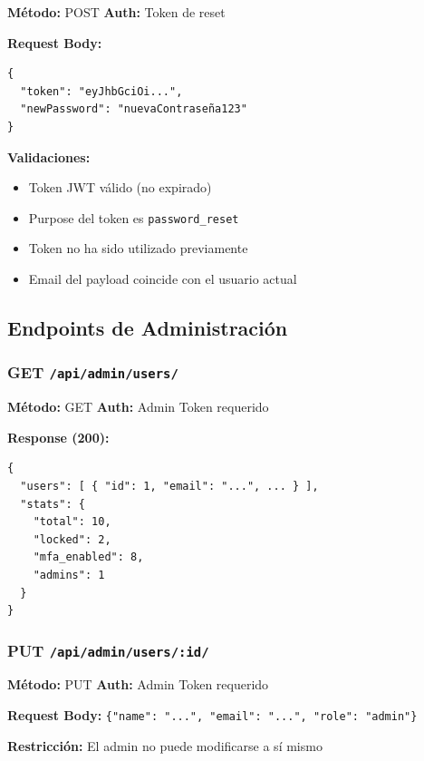 \documentclass[12pt,a4paper,openany]{article}
\begin{document}
\begin{infobox}
\textbf{Método:} POST \quad \textbf{Auth:} Token de reset

\textbf{Request Body:}
\begin{lstlisting}[style=jsstyle]
{
  "token": "eyJhbGciOi...",
  "newPassword": "nuevaContraseña123"
}
\end{lstlisting}

\textbf{Validaciones:}
\begin{itemize}
    \item Token JWT válido (no expirado)
    \item Purpose del token es \texttt{password\_reset}
    \item Token no ha sido utilizado previamente
    \item Email del payload coincide con el usuario actual
\end{itemize}
\end{infobox}

\subsection{Endpoints de Administración}

\subsubsection{GET \texttt{/api/admin/users/}}

\begin{infobox}
\textbf{Método:} GET \quad \textbf{Auth:} Admin Token requerido

\textbf{Response (200):}
\begin{lstlisting}[style=jsstyle]
{
  "users": [ { "id": 1, "email": "...", ... } ],
  "stats": {
    "total": 10,
    "locked": 2,
    "mfa_enabled": 8,
    "admins": 1
  }
}
\end{lstlisting}
\end{infobox}

\subsubsection{PUT \texttt{/api/admin/users/:id/}}

\begin{infobox}
\textbf{Método:} PUT \quad \textbf{Auth:} Admin Token requerido

\textbf{Request Body:} \texttt{\{"name": "...", "email": "...", "role": "admin"\}}

\textbf{Restricción:} El admin no puede modificarse a sí mismo
\end{infobox}
\end{document}
